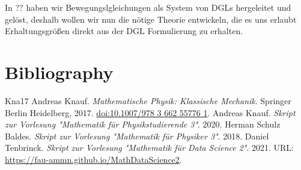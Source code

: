 \documentclass[letterpaper,10pt,english]{jupyterBook}
\begin{document}
In ?? haben wir Bewegungslgleichungen als System von DGLs hergeleitet und gelöst, deshalb wollen wir nun die nötige Theorie entwickeln, die es uns erlaubt Erhaltungsgrößen direkt aus der DGL Formulierung zu erhalten.
\label{ode/hamilton:example-0}
\begin{example}{}{}


\end{example}


\chapter{Bibliography}
\label{\detokenize{references:bibliography}}\label{\detokenize{references::doc}}


\begin{sphinxthebibliography}{Kna17}
Andreas Knauf. \emph{Mathematische Physik: Klassische Mechanik}. Springer Berlin Heidelberg, 2017. \href{https://doi.org/10.1007/978-3-662-55776-1}{doi:10.1007/978 3 662 55776 1}.
Andreas Knauf. \emph{Skript zur Vorlesung "Mathematik für Physikstudierende 3"}. 2020.
Herman Schulz Baldes. \emph{Skript zur Vorlesung "Mathematik für Physiker 3"}. 2018.
Daniel Tenbrinck. \emph{Skript zur Vorlesung "Mathematik für Data Science 2"}. 2021. URL: \url{https://fau-ammn.github.io/MathDataScience2}.
\end{sphinxthebibliography}






\renewcommand{\indexname}{Proof Index}


\renewcommand{\indexname}{Index}
\end{document}
